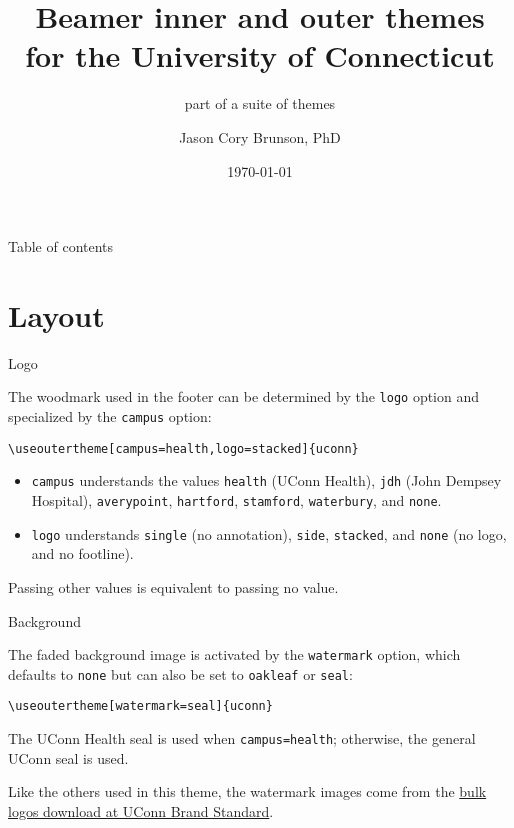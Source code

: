 \documentclass{beamer}
\title[Beamer inner and outer themes for UConn]{Beamer inner and outer themes\\ for the University of Connecticut}
\subtitle{part of a suite of themes}
\author[Cory Brunson]{Jason Cory Brunson, PhD}
\institute[UConn Health]{Center for Quantitative Medicine\\ University of Connecticut School of Medicine}
\date{\today}
\begin{document}
\begin{frame}
\titlepage
\end{frame}


\begin{frame}{Table of contents}
\tableofcontents
\end{frame}


\section{Layout}


\begin{frame}[fragile]{Logo}

The woodmark used in the footer can be determined by the \verb|logo| option and specialized by the \verb|campus| option:

\begin{verbatim}
\useoutertheme[campus=health,logo=stacked]{uconn}
\end{verbatim}

\begin{itemize}
\item \verb|campus| understands the values \verb|health| (UConn Health), \verb|jdh| (John Dempsey Hospital), \verb|averypoint|, \verb|hartford|, \verb|stamford|, \verb|waterbury|, and \verb|none|.
\item \verb|logo| understands \verb|single| (no annotation), \verb|side|, \verb|stacked|, and \verb|none| (no logo, and no footline).
\end{itemize}
Passing other values is equivalent to passing no value.

\end{frame}


\begin{frame}[fragile]{Background}

The faded background image is activated by the \verb|watermark| option, which defaults to \verb|none| but can also be set to \verb|oakleaf| or \verb|seal|:

\begin{verbatim}
\useoutertheme[watermark=seal]{uconn}
\end{verbatim}

The UConn Health seal is used when \verb|campus=health|; otherwise, the general UConn seal is used.

Like the others used in this theme, the watermark images come from the \href{https://brand.uconn.edu/downloads/logos/}{bulk logos download at UConn Brand Standard}.

\end{frame}
\end{document}
